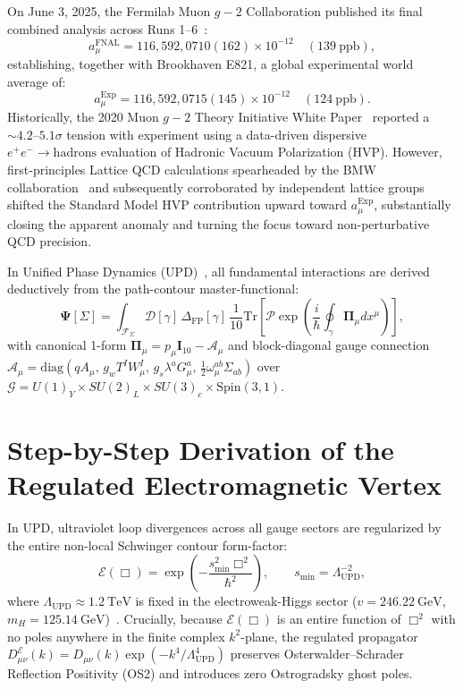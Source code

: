 \documentclass[11pt,a4paper]{article}
\begin{document}
On June 3, 2025, the Fermilab Muon $g-2$ Collaboration published its final combined analysis across Runs 1--6~\cite{fnal2025}:
\begin{equation}
a_\mu^{\mathrm{FNAL}} = 116,592,0710(162) \times 10^{-12} \quad (139\ \mathrm{ppb}),
\end{equation}
establishing, together with Brookhaven E821, a global experimental world average of:
\begin{equation}
a_\mu^{\mathrm{Exp}} = 116,592,0715(145) \times 10^{-12} \quad (124\ \mathrm{ppb}).
\end{equation}
Historically, the 2020 Muon $g-2$ Theory Initiative White Paper~\cite{aoyama2020} reported a $\sim 4.2\text{--}5.1\sigma$ tension with experiment using a data-driven dispersive $e^+e^- \to \text{hadrons}$ evaluation of Hadronic Vacuum Polarization (HVP). However, first-principles Lattice QCD calculations spearheaded by the BMW collaboration~\cite{bmw2021} and subsequently corroborated by independent lattice groups shifted the Standard Model HVP contribution upward toward $a_\mu^{\mathrm{Exp}}$, substantially closing the apparent anomaly and turning the focus toward non-perturbative QCD precision.

In Unified Phase Dynamics (UPD)~\cite{monograph}, all fundamental interactions are derived deductively from the path-contour master-functional:
\begin{equation}
\mathbf{\Psi}[\Sigma] = \int_{\mathcal{F}_\Sigma} \mathcal{D}[\gamma]\,\Delta_{\mathrm{FP}}[\gamma]\,\frac{1}{10}\mathrm{Tr}\left[\mathcal{P}\exp\left(\frac{i}{\hbar}\oint_\gamma \mathbf{\Pi}_\mu dx^\mu\right)\right],
\end{equation}
with canonical 1-form $\mathbf{\Pi}_\mu = p_\mu \mathbf{I}_{10} - \mathbf{\mathcal{A}}_\mu$ and block-diagonal gauge connection $\mathbf{\mathcal{A}}_\mu = \mathrm{diag}(q A_\mu,\, g_w T^I W_\mu^I,\, g_s \lambda^a G_\mu^a,\, \frac{1}{2}\omega_\mu^{ab}\Sigma_{ab})$ over $\mathcal{G} = U(1)_Y \times SU(2)_L \times SU(3)_c \times \mathrm{Spin}(3,1)$.

\section{Step-by-Step Derivation of the Regulated Electromagnetic Vertex}
In UPD, ultraviolet loop divergences across all gauge sectors are regularized by the entire non-local Schwinger contour form-factor:
\begin{equation}
\mathcal{E}(\Box) = \exp\!\left(-\frac{s_{\min}^2 \Box^2}{\hbar^2}\right), \qquad s_{\min} = \Lambda_{\mathrm{UPD}}^{-2},
\end{equation}
where $\Lambda_{\mathrm{UPD}} \approx 1.2\ \mathrm{TeV}$ is fixed in the electroweak-Higgs sector ($v = 246.22\ \mathrm{GeV}$, $m_H = 125.14\ \mathrm{GeV}$)~\cite{higgs}. Crucially, because $\mathcal{E}(\Box)$ is an entire function of $\Box^2$ with no poles anywhere in the finite complex $k^2$-plane, the regulated propagator $D_{\mu\nu}^{\mathcal{E}}(k) = D_{\mu\nu}(k)\exp(-k^4/\Lambda_{\mathrm{UPD}}^4)$ preserves Osterwalder--Schrader Reflection Positivity (OS2) and introduces zero Ostrogradsky ghost poles.
\end{document}

